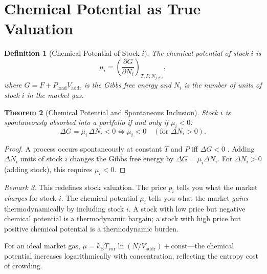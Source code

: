 \documentclass[twocolumn,10pt]{article}
\newtheorem{theorem}{Theorem}[section]
\newtheorem{definition}[theorem]{Definition}
\theoremstyle{remark}
\newtheorem{remark}[theorem]{Remark}
\newcommand{\kB}{k_{\mathrm{B}}}
\newcommand{\Tvar}{T_{\mathrm{var}}}
\newcommand{\Pload}{P_{\mathrm{load}}}
\newcommand{\Vaddr}{V_{\mathrm{addr}}}
\begin{document}
\section{Chemical Potential as True Valuation}
\label{sec:chemical_potential}

\begin{definition}[Chemical Potential of Stock $i$]
\label{def:chemical_potential}
The \emph{chemical potential} of stock $i$ is
\begin{equation}
    \mu_i = \left(\frac{\partial G}{\partial N_i}\right)_{T, P, N_{j \neq i}},
    \label{eq:chemical_potential}
\end{equation}
where $G = F + \Pload\Vaddr$ is the Gibbs free energy and $N_i$ is the number of units of stock $i$ in the market gas.
\end{definition}

\begin{theorem}[Chemical Potential and Spontaneous Inclusion]
\label{thm:spontaneous}
Stock $i$ is spontaneously absorbed into a portfolio if and only if $\mu_i < 0$:
\begin{equation}
    \Delta G = \mu_i \, \Delta N_i < 0 \iff \mu_i < 0 \quad (\text{for } \Delta N_i > 0).
    \label{eq:spontaneous}
\end{equation}
\end{theorem}

\begin{proof}
A process occurs spontaneously at constant $T$ and $P$ iff $\Delta G < 0$ \cite{landau1980}.  Adding $\Delta N_i$ units of stock $i$ changes the Gibbs free energy by $\Delta G = \mu_i \Delta N_i$.  For $\Delta N_i > 0$ (adding stock), this requires $\mu_i < 0$.
\end{proof}

\begin{remark}
This redefines stock valuation.  The price $p_i$ tells you what the market \emph{charges} for stock $i$.  The chemical potential $\mu_i$ tells you what the market \emph{gains} thermodynamically by including stock $i$.  A stock with low price but negative chemical potential is a thermodynamic bargain; a stock with high price but positive chemical potential is a thermodynamic burden.
\end{remark}

For an ideal market gas, $\mu = \kB\Tvar \ln(N / \Vaddr) + \text{const}$---the chemical potential increases logarithmically with concentration, reflecting the entropy cost of crowding.
\end{document}
